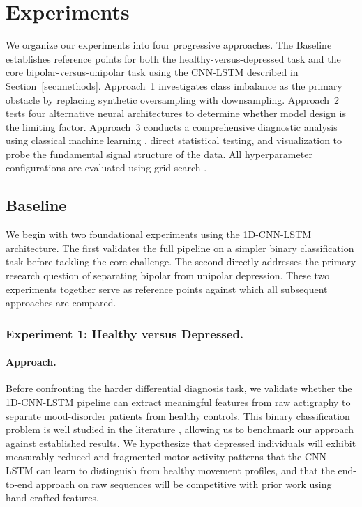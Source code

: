 \section{Experiments}
\label{sec:experiments}

We organize our experiments into four progressive approaches. The Baseline establishes reference points for both the healthy-versus-depressed task and the core bipolar-versus-unipolar task using the CNN-LSTM described in Section~\ref{sec:methods}. Approach~1 investigates class imbalance as the primary obstacle by replacing synthetic oversampling with downsampling. Approach~2 tests four alternative neural architectures to determine whether model design is the limiting factor. Approach~3 conducts a comprehensive diagnostic analysis using classical machine learning \cite{pedregosa2011sklearn}, direct statistical testing, and visualization to probe the fundamental signal structure of the data. All hyperparameter configurations are evaluated using grid search \cite{bergstra2012random}.

\subsection{Baseline}

We begin with two foundational experiments using the 1D-CNN-LSTM architecture. The first validates the full pipeline on a simpler binary classification task before tackling the core challenge. The second directly addresses the primary research question of separating bipolar from unipolar depression. These two experiments together serve as reference points against which all subsequent approaches are compared.

\subsubsection{Experiment 1: Healthy versus Depressed.}

\paragraph{Approach.}
Before confronting the harder differential diagnosis task, we validate whether the 1D-CNN-LSTM pipeline can extract meaningful features from raw actigraphy to separate mood-disorder patients from healthy controls. This binary classification problem is well studied in the literature \cite{garcia2018depresjon,jakobsen2020applying}, allowing us to benchmark our approach against established results. We hypothesize that depressed individuals will exhibit measurably reduced and fragmented motor activity patterns that the CNN-LSTM can learn to distinguish from healthy movement profiles, and that the end-to-end approach on raw sequences will be competitive with prior work using hand-crafted features.

